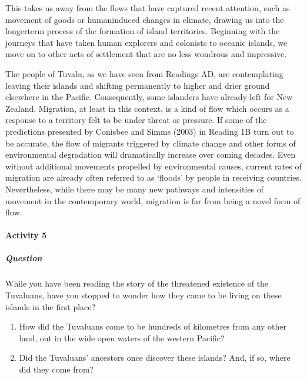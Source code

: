 \documentclass[letterpaper,10pt,english]{sphinxmanual}
\begin{document}
This takes us away from the flows that have captured recent attention, such as movement of goods or human\sphinxhyphen{}induced changes in climate, drawing us into the longer\sphinxhyphen{}term process of the formation of island territories. Beginning with the journeys that have taken human explorers and colonists to oceanic islands, we move on to other acts of settlement that are no less wondrous and impressive.

The people of Tuvalu, as we have seen from Readings A\textendash{}D, are contemplating leaving their islands and shifting permanently to higher and drier ground elsewhere in the Pacific. Consequently, some islanders have already left for New Zealand. Migration, at least in this context, is a kind of flow which occurs as a response to a territory felt to be under threat or pressure. If some of the predictions presented by Conisbee and Simms (2003) in Reading 1B turn out to be accurate, the flow of migrants
triggered by climate change and other forms of environmental degradation will dramatically increase over coming decades. Even without additional movements propelled by environmental causes, current rates of migration are already often referred to as ‘floods’ by people in receiving countries. Nevertheless, while there may be many new pathways and intensities of movement in the contemporary world, migration is far from being a novel form of flow.


\paragraph{Activity 5}
\label{\detokenize{content/session_00/Part_00_03:Activity-5}}

\subparagraph{Question}
\label{\detokenize{content/session_00/Part_00_03:Question}}
While you have been reading the story of the threatened existence of the Tuvaluans, have you stopped to wonder how they came to be living on these islands in the first place?
\begin{enumerate}
%
\item {} 
How did the Tuvaluans come to be hundreds of kilometres from any other land, out in the wide open waters of the western Pacific?

\item {} 
Did the Tuvaluans’ ancestors once discover these islands? And, if so, where did they come from?

\end{enumerate}
\end{document}
